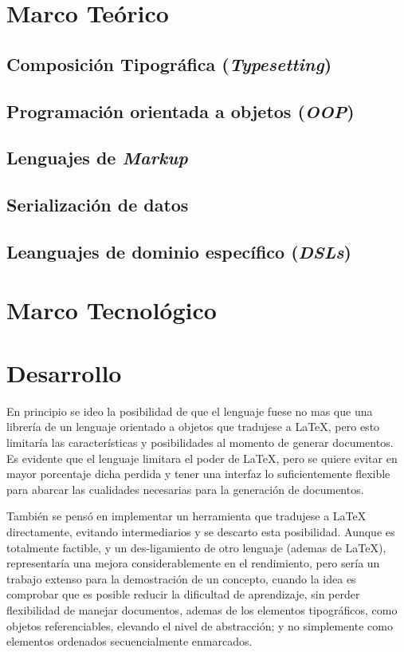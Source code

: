 \documentclass[12pt,letterpaper,titlepage,oneside,openright]{book}
\newcommand{\latex}{\LaTeX\xspace}
\begin{document}
\chapter{Marco Teórico}
\lipsum[1-2]
\section{Composición Tipográfica (\textit{Typesetting})}
\section{Programación orientada a objetos (\textit{OOP})}
\section{Lenguajes de \textit{Markup}}
\section{Serialización de datos}
\section{Leanguajes de dominio específico (\textit{DSLs})}

\chapter{Marco Tecnológico}
\lipsum[1-2]

\chapter{Desarrollo}
En principio se ideo la posibilidad de que el lenguaje fuese no mas que una
librería de un lenguaje orientado a objetos que tradujese a \latex, pero esto
limitaría las características y posibilidades al momento de generar documentos.
Es evidente que el lenguaje limitara el poder de \latex, pero se quiere evitar
en mayor porcentaje dicha perdida y tener una interfaz lo suficientemente
flexible para abarcar las cualidades necesarias para la generación de documentos.

También se pensó en implementar un herramienta que tradujese a \latex
directamente, evitando intermediarios y se descarto esta posibilidad. Aunque es
totalmente factible, y un des-ligamiento de otro lenguaje (ademas de \latex),
representaría una mejora considerablemente en el rendimiento, pero sería un
trabajo extenso para la demostración de un concepto, cuando la idea es comprobar
que es posible reducir la dificultad de aprendizaje, sin perder flexibilidad de
manejar documentos, ademas de los elementos tipográficos, como objetos
referenciables, elevando el nivel de abstracción; y no simplemente como
elementos ordenados secuencialmente enmarcados.
\end{document}
